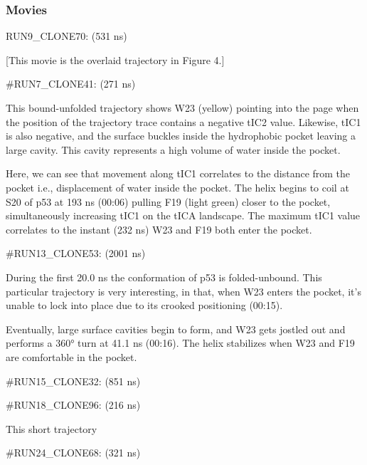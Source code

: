 \subsubsection{Movies}


RUN9\_CLONE70: (531 ns)

{[}This movie is the overlaid trajectory in Figure 4.{]}

\#RUN7\_CLONE41: (271 ns)

This bound-unfolded trajectory shows W23 (yellow) pointing into the page
when the position of the trajectory trace contains a negative tIC2
value. Likewise, tIC1 is also negative, and the surface buckles inside
the hydrophobic pocket leaving a large cavity. This cavity represents a
high volume of water inside the pocket.

Here, we can see that movement along tIC1 correlates to the distance
from the pocket i.e., displacement of water inside the pocket. The helix
begins to coil at S20 of p53 at 193 ns (00:06) pulling F19 (light green)
closer to the pocket, simultaneously increasing tIC1 on the tICA
landscape. The maximum tIC1 value correlates to the instant (232 ns) W23
and F19 both enter the pocket.

\#RUN13\_CLONE53: (2001 ns)

During the first 20.0 ns the conformation of p53 is folded-unbound. This
particular trajectory is very interesting, in that, when W23 enters the
pocket, it's unable to lock into place due to its crooked positioning
(00:15).

Eventually, large surface cavities begin to form, and W23 gets jostled
out and performs a 360° turn at 41.1 ns (00:16). The helix stabilizes
when W23 and F19 are comfortable in the pocket.

\#RUN15\_CLONE32: (851 ns)

\#RUN18\_CLONE96: (216 ns)

This short trajectory

\#RUN24\_CLONE68: (321 ns)





